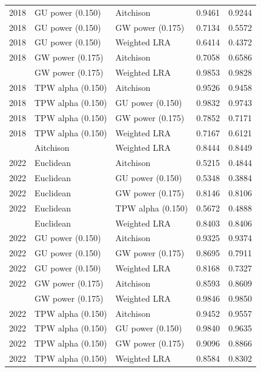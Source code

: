 \begin{longtable}[t]{rllrr}
2018 & GU power (0.150) & Aitchison & 0.9461 & 0.9244\\
2018 & GU power (0.150) & GW power (0.175) & 0.7134 & 0.5572\\
2018 & GU power (0.150) & Weighted LRA & 0.6414 & 0.4372\\
2018 & GW power (0.175) & Aitchison & 0.7058 & 0.6586\\
\addlinespace
2018 & GW power (0.175) & Weighted LRA & 0.9853 & 0.9828\\
2018 & TPW alpha (0.150) & Aitchison & 0.9526 & 0.9458\\
2018 & TPW alpha (0.150) & GU power (0.150) & 0.9832 & 0.9743\\
2018 & TPW alpha (0.150) & GW power (0.175) & 0.7852 & 0.7171\\
2018 & TPW alpha (0.150) & Weighted LRA & 0.7167 & 0.6121\\
\addlinespace
2022 & Aitchison & Weighted LRA & 0.8444 & 0.8449\\
2022 & Euclidean & Aitchison & 0.5215 & 0.4844\\
2022 & Euclidean & GU power (0.150) & 0.5348 & 0.3884\\
2022 & Euclidean & GW power (0.175) & 0.8146 & 0.8106\\
2022 & Euclidean & TPW alpha (0.150) & 0.5672 & 0.4888\\
\addlinespace
2022 & Euclidean & Weighted LRA & 0.8403 & 0.8406\\
2022 & GU power (0.150) & Aitchison & 0.9325 & 0.9374\\
2022 & GU power (0.150) & GW power (0.175) & 0.8695 & 0.7911\\
2022 & GU power (0.150) & Weighted LRA & 0.8168 & 0.7327\\
2022 & GW power (0.175) & Aitchison & 0.8593 & 0.8609\\
\addlinespace
2022 & GW power (0.175) & Weighted LRA & 0.9846 & 0.9850\\
2022 & TPW alpha (0.150) & Aitchison & 0.9452 & 0.9557\\
2022 & TPW alpha (0.150) & GU power (0.150) & 0.9840 & 0.9635\\
2022 & TPW alpha (0.150) & GW power (0.175) & 0.9096 & 0.8866\\
2022 & TPW alpha (0.150) & Weighted LRA & 0.8584 & 0.8302\\
\bottomrule
\end{longtable}
